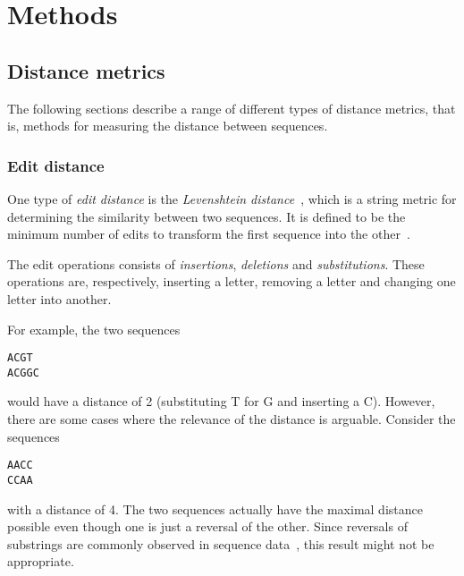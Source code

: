 \section{Methods}

\subsection{Distance metrics}

The following sections describe a range of different types of distance metrics,
that is, methods for measuring the distance between sequences.

\subsubsection{Edit distance}

One type of \emph{edit distance} is the \emph{Levenshtein
distance}~\cite{levenshtein}, which is a string metric for determining the
similarity between two sequences. It is defined to be the minimum number of
edits to transform the first sequence into the other~\cite[p.~52]{dong}.

The edit operations consists of \emph{insertions}, \emph{deletions} and
\emph{substitutions}. These operations are, respectively, inserting a letter,
removing a letter and changing one letter into another.

For example, the two sequences
\begin{center}
  \texttt{ACGT} \\
  \texttt{ACGGC}
\end{center}
would have a distance of 2 (substituting T for G and inserting a C). However,
there are some cases where the relevance of the distance is arguable. Consider
the sequences
\begin{center}
  \texttt{AACC} \\
  \texttt{CCAA}
\end{center}
with a distance of 4. The two sequences actually have the maximal distance
possible even though one is just a reversal of the other. Since reversals of
substrings are commonly observed in sequence data~\cite{arslan}, this result
might not be appropriate.


